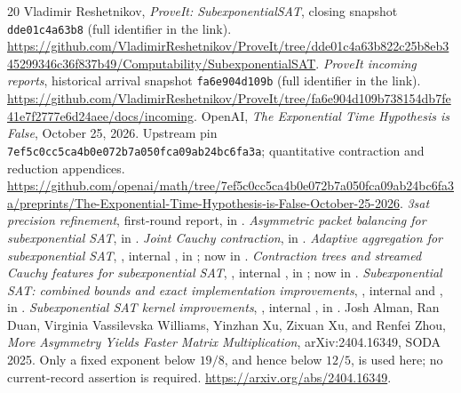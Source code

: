 \documentclass[11pt,letterpaper]{article}
\theoremstyle{remark}\newtheorem{remark}[theorem]{Remark}
\begin{document}
\begin{thebibliography}{20}
 Vladimir Reshetnikov, \emph{ProveIt: SubexponentialSAT},
closing snapshot \texttt{dde01c4a63b8} (full identifier in the link).
\url{https://github.com/VladimirReshetnikov/ProveIt/tree/dde01c4a63b822c25b8eb345299346c36f837b49/Computability/SubexponentialSAT}.
 \emph{ProveIt incoming reports}, historical arrival
snapshot \texttt{fa6e904d109b} (full identifier in the link).
\url{https://github.com/VladimirReshetnikov/ProveIt/tree/fa6e904d109b738154db7fe41e7f2777e6d24aee/docs/incoming}.
 OpenAI, \emph{The Exponential Time Hypothesis is False},
October 25, 2026. Upstream pin
\texttt{7ef5c0cc5ca4b0e072b7a050fca09ab24bc6fa3a}; quantitative contraction
and reduction appendices.
\url{https://github.com/openai/math/tree/7ef5c0cc5ca4b0e072b7a050fca09ab24bc6fa3a/preprints/The-Exponential-Time-Hypothesis-is-False-October-25-2026}.
 \emph{3sat precision refinement}, first-round report,
 in \cite{repo}.
 \emph{Asymmetric packet balancing for subexponential
SAT},  in
\cite{repo}.
 \emph{Joint Cauchy contraction},
 in \cite{repo}.
 \emph{Adaptive aggregation for subexponential SAT},
, internal
, in \cite{incoming}; now
 in \cite{repo}.
 \emph{Contraction trees and streamed Cauchy features for
subexponential SAT}, , internal
, in \cite{incoming}; now
 in \cite{repo}.
 \emph{Subexponential SAT: combined bounds and exact
implementation improvements},
, internal
 and , in \cite{incoming}.
 \emph{Subexponential SAT kernel improvements},
, internal
, in \cite{incoming}.
 Josh Alman, Ran Duan, Virginia Vassilevska Williams,
Yinzhan Xu, Zixuan Xu, and Renfei Zhou,
\emph{More Asymmetry Yields Faster Matrix Multiplication},
arXiv:2404.16349, SODA 2025. Only a fixed exponent below $19/8$, and hence
below $12/5$, is used here; no current-record assertion is required.
\url{https://arxiv.org/abs/2404.16349}.
\end{thebibliography}
\end{document}
